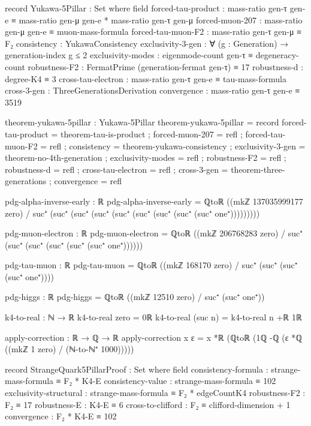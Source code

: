 \documentclass[11pt,a4paper]{book}
\begin{document}
\begin{code}
record Yukawa-5Pillar : Set where
  field
    forced-tau-product   : mass-ratio gen-τ gen-e ≡ mass-ratio gen-μ gen-e * mass-ratio gen-τ gen-μ
    forced-muon-207      : mass-ratio gen-μ gen-e ≡ muon-mass-formula
    forced-tau-muon-F2   : mass-ratio gen-τ gen-μ ≡ F₂
    consistency          : YukawaConsistency
    exclusivity-3-gen    : ∀ (g : Generation) → generation-index g ≤ 2
    exclusivity-modes    : eigenmode-count gen-τ ≡ degeneracy-count
    robustness-F2        : FermatPrime (generation-fermat gen-τ) ≡ 17
    robustness-d         : degree-K4 ≡ 3
    cross-tau-electron   : mass-ratio gen-τ gen-e ≡ tau-mass-formula
    cross-3-gen          : ThreeGenerationsDerivation
    convergence          : mass-ratio gen-τ gen-e ≡ 3519

theorem-yukawa-5pillar : Yukawa-5Pillar
theorem-yukawa-5pillar = record
  { forced-tau-product   = theorem-tau-is-product
  ; forced-muon-207      = refl
  ; forced-tau-muon-F2   = refl
  ; consistency          = theorem-yukawa-consistency
  ; exclusivity-3-gen    = theorem-no-4th-generation
  ; exclusivity-modes    = refl
  ; robustness-F2        = refl
  ; robustness-d         = refl
  ; cross-tau-electron   = refl
  ; cross-3-gen          = theorem-three-generations
  ; convergence          = refl
  }

pdg-alpha-inverse-early : ℝ
pdg-alpha-inverse-early = ℚtoℝ ((mkℤ 137035999177 zero) / suc⁺ (suc⁺ (suc⁺ (suc⁺ (suc⁺ (suc⁺ (suc⁺ (suc⁺ (suc⁺ one⁺)))))))))

pdg-muon-electron : ℝ
pdg-muon-electron = ℚtoℝ ((mkℤ 206768283 zero) / suc⁺ (suc⁺ (suc⁺ (suc⁺ (suc⁺ (suc⁺ one⁺))))))

pdg-tau-muon : ℝ
pdg-tau-muon = ℚtoℝ ((mkℤ 168170 zero) / suc⁺ (suc⁺ (suc⁺ (suc⁺ one⁺))))

pdg-higgs : ℝ
pdg-higgs = ℚtoℝ ((mkℤ 12510 zero) / suc⁺ (suc⁺ one⁺))

k4-to-real : ℕ → ℝ
k4-to-real zero = 0ℝ
k4-to-real (suc n) = k4-to-real n +ℝ 1ℝ

apply-correction : ℝ → ℚ → ℝ
apply-correction x ε = x *ℝ (ℚtoℝ (1ℚ -ℚ (ε *ℚ ((mkℤ 1 zero) / (ℕ-to-ℕ⁺ 1000)))))

record StrangeQuark5PillarProof : Set where
  field
    consistency-formula : strange-mass-formula ≡ F₂ * K4-E
    consistency-value : strange-mass-formula ≡ 102
    exclusivity-structural : strange-mass-formula ≡ F₂ * edgeCountK4
    robustness-F2 : F₂ ≡ 17
    robustness-E : K4-E ≡ 6
    cross-to-clifford : F₂ ≡ clifford-dimension + 1
    convergence : F₂ * K4-E ≡ 102


\end{code}
\end{document}
